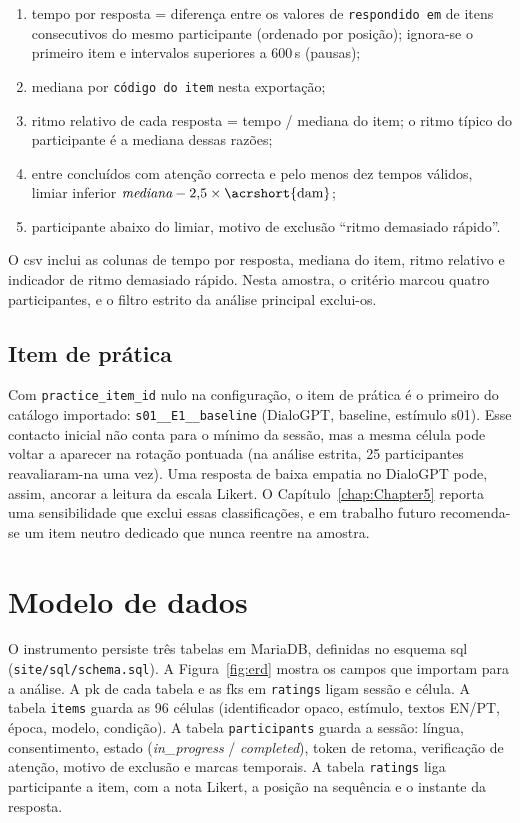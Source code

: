 \begin{enumerate}
 \item tempo por resposta = diferença entre os valores de \texttt{respondido em} de itens consecutivos do mesmo participante (ordenado por posição); ignora-se o primeiro item e intervalos superiores a 600\,s (pausas);
 \item mediana por \texttt{código do item} nesta exportação;
 \item ritmo relativo de cada resposta = tempo / mediana do item; o ritmo típico do participante é a mediana dessas razões;
 \item entre concluídos com atenção correcta e pelo menos dez tempos válidos, limiar inferior \(\textit{mediana} - 2{,}5 \times \text{\acrshort{dam}}\);
 \item participante abaixo do limiar, motivo de exclusão ``ritmo demasiado rápido''.
\end{enumerate}

O \gls{csv} inclui as colunas de tempo por resposta, mediana do item, ritmo relativo e indicador de ritmo demasiado rápido. Nesta amostra, o critério marcou quatro participantes, e o filtro estrito da análise principal exclui-os.

\subsection{Item de prática}
\label{subsec:impl_pratica}

Com \texttt{practice\_item\_id} nulo na configuração, o item de prática é o primeiro do catálogo importado: \texttt{s01\_\_E1\_\_baseline} (DialoGPT, baseline, estímulo s01). Esse contacto inicial não conta para o mínimo da sessão, mas a mesma célula pode voltar a aparecer na rotação pontuada (na análise estrita, 25 participantes reavaliaram-na uma vez). Uma resposta de baixa empatia no DialoGPT pode, assim, ancorar a leitura da escala Likert. O Capítulo~\ref{chap:Chapter5} reporta uma sensibilidade que exclui essas classificações, e em trabalho futuro recomenda-se um item neutro dedicado que nunca reentre na amostra.


\section{Modelo de dados}
\label{sec:impl_dados}

O instrumento persiste três tabelas em MariaDB, definidas no esquema \gls{sql} (\texttt{site/sql/schema.sql}). A Figura~\ref{fig:erd} mostra os campos que importam para a análise. A \gls{pk} de cada tabela e as \glspl{fk} em \texttt{ratings} ligam sessão e célula. A tabela \texttt{items} guarda as 96 células (identificador opaco, estímulo, textos EN/PT, época, modelo, condição). A tabela \texttt{participants} guarda a sessão: língua, consentimento, estado (\textit{in\_progress} / \textit{completed}), token de retoma, verificação de atenção, motivo de exclusão e marcas temporais. A tabela \texttt{ratings} liga participante a item, com a nota Likert, a posição na sequência e o instante da resposta.

